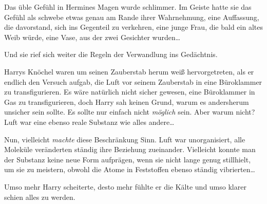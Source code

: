 Das üble Gefühl in Hermines Magen wurde schlimmer. Im Geiste hatte sie das Gefühl als schwebe etwas genau am Rande ihrer Wahrnehmung, eine Auffassung, die davorstand, sich ins Gegenteil zu verkehren, eine junge Frau, die bald ein altes Weib würde, eine Vase, aus der zwei Gesichter wurden…

Und sie rief sich weiter die Regeln der Verwandlung ins Gedächtnis.

\later

Harrys Knöchel waren um seinen Zauberstab herum weiß hervorgetreten, als er endlich den Versuch aufgab, die Luft vor seinem Zauberstab in eine Büroklammer zu transfigurieren. Es wäre natürlich nicht sicher gewesen, eine Büroklammer in Gas zu transfigurieren, doch Harry sah keinen Grund, warum es andersherum unsicher sein sollte. Es sollte nur einfach nicht \emph{möglich} sein. Aber warum nicht? Luft war eine ebenso reale Substanz wie alles andere…

Nun, vielleicht \emph{machte} diese Beschränkung Sinn. Luft war unorganisiert, alle Moleküle veränderten ständig ihre Beziehung zueinander. Vielleicht konnte man der Substanz keine neue Form aufprägen, wenn sie nicht lange genug stillhielt, um sie zu meistern, obwohl die Atome in Feststoffen ebenso ständig vibrierten…

Umso mehr Harry scheiterte, desto mehr fühlte er die Kälte und umso klarer schien alles zu werden.

